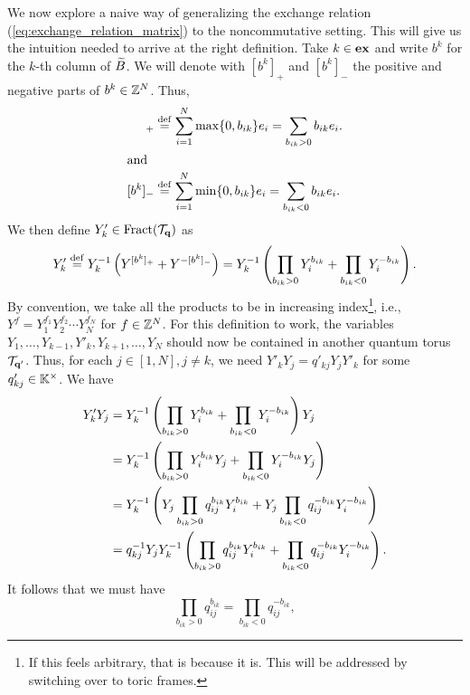 We now explore a naive way of generalizing the exchange relation
(\cref{eq:exchange_relation_matrix}) to the noncommutative setting. This will give us
the intuition needed to arrive at the right definition. Take $k \in \mathbf{ex}$ and write
$b^k$ for the $k$-th column of $\widetilde{B}$. We will denote with
$[b^k]_{+}$ and $[b^k]_{-}$ the positive and
negative parts of $b^k \in \mathbb{Z}^N$. Thus,
\begin{align*}
	[b^k]_{+} & \defeq \sum_{i=1}^N \max\{0, b_{ik}\}e_i = \sum_{b_{ik} > 0} b_{ik}e_i. \\
	\shortintertext{and}
	[b^k]_{-} & \defeq \sum_{i=1}^N \min\{0, b_{ik}\}e_i = \sum_{b_{ik} < 0} b_{ik}e_i.
\end{align*}
We then define $Y'_k \in \operatorname{Fract}(\mathcal{T}_{\mathbf{q}})$ as
\begin{equation}\label{eq:quantum_exchange_naive}
	Y_k' \overset{\mathrm{def}}{=} Y_k^{-1} \left(Y^{[b^k]_{+}} + Y^{-[b^k]_{-}}\right) = Y_k^{-1} \left(\prod_{b_{ik} > 0}Y_i^{b_{ik}} + \prod_{b_{ik} < 0} Y_i^{-b_{ik}}\right).
\end{equation}
%
By convention, we take all the products to be in increasing index\footnote{If this
	feels arbitrary, that is because it is. This will be addressed by switching over to
	toric frames.}, i.e., $Y^f = Y_1^{f_1}Y_2^{f_2} \cdots Y_N^{f_N}$ for $f \in \mathbb{Z}^N$.
For this definition to work, the variables $Y_1, \dots, Y_{k-1}, Y'_k, Y_{k+1}, \dots,
	Y_N$ should now be contained in another quantum torus $\mathcal{T}_{\mathbf{q}'}$. Thus, for each $j
	\in [1, N], j \neq k$, we need $Y'_k Y_j = q'_{kj} Y_j Y'_k$ for some $q'_{kj} \in
	\mathbb{K}^\times$. We have
\begin{align*}
	Y'_k Y_j
	 & = Y_k^{-1} \left(\prod_{b_{ik} > 0} Y_i^{b_{ik}} + \prod_{b_{ik} < 0}Y_i^{-b_{ik}}\right) Y_j                                             \\
	 & = Y_k^{-1} \left(\prod_{b_{ik} > 0} Y_i^{b_{ik}}Y_j + \prod_{b_{ik} < 0}Y_i^{-b_{ik}}Y_j\right)                                           \\
	 & = Y_k^{-1} \left(Y_j \prod_{b_{ik} > 0} q_{ij}^{b_{ik}} Y_i^{b_{ik}} + Y_j \prod_{b_{ik} < 0}q_{ij}^{-b_{ik}}Y_i^{-b_{ik}}\right)         \\
	 & = q_{kj}^{-1} Y_j Y_k^{-1} \left(\prod_{b_{ik} > 0} q_{ij}^{b_{ik}} Y_i^{b_{ik}} + \prod_{b_{ik} < 0}q_{ij}^{-b_{ik}}Y_i^{-b_{ik}}\right).
\end{align*}
%
It follows that we must have
\begin{equation}\label{eq:b_plus_is_b_minus}
	\prod_{b_{ik} > 0}q_{ij}^{b_{ik}} = \prod_{b_{ik} < 0}q_{ij}^{ - b_{ik}},
\end{equation}
